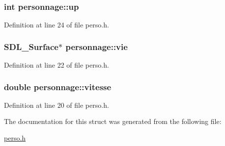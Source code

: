 \subsubsection[{\texorpdfstring{up}{up}}]{\setlength{\rightskip}{0pt plus 5cm}int personnage\+::up}\hypertarget{structpersonnage_ad781b14c9d0a4f927e6471b9cf1234df}{}\label{structpersonnage_ad781b14c9d0a4f927e6471b9cf1234df}


Definition at line 24 of file perso.\+h.

\subsubsection[{\texorpdfstring{vie}{vie}}]{\setlength{\rightskip}{0pt plus 5cm}S\+D\+L\+\_\+\+Surface$\ast$ personnage\+::vie}\hypertarget{structpersonnage_a3a476ed3aa74ef4eb7ea482739443401}{}\label{structpersonnage_a3a476ed3aa74ef4eb7ea482739443401}


Definition at line 22 of file perso.\+h.

\subsubsection[{\texorpdfstring{vitesse}{vitesse}}]{\setlength{\rightskip}{0pt plus 5cm}double personnage\+::vitesse}\hypertarget{structpersonnage_a9833848acdb28a307902c8e1682213d9}{}\label{structpersonnage_a9833848acdb28a307902c8e1682213d9}


Definition at line 20 of file perso.\+h.



The documentation for this struct was generated from the following file\+:\begin{DoxyCompactItemize}
\item 
\hyperlink{perso_8h}{perso.\+h}\end{DoxyCompactItemize}
